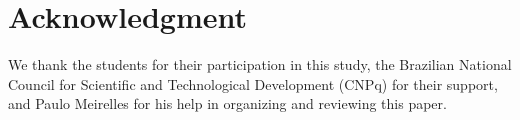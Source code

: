 \section*{Acknowledgment}
\label{sec:acknowledgment}

We thank the students for their participation in this study, the Brazilian
National Council for Scientific and Technological Development (CNPq) for their
support, and Paulo Meirelles for his help in organizing and reviewing this
paper.
